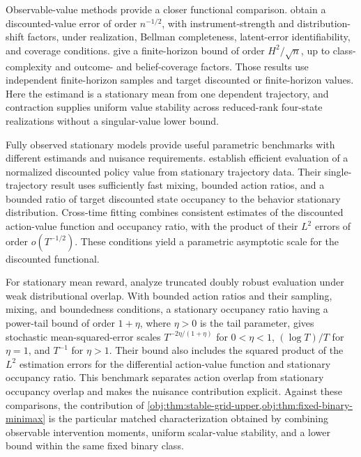 \documentclass[11pt]{article}
\begin{document}
Observable-value methods provide a closer functional comparison. \citet[Theorem 3]{Uehara2023} obtain a discounted-value error of order \(n^{-1/2}\), with instrument-strength and distribution-shift factors, under realization, Bellman completeness, latent-error identifiability, and coverage conditions. \citet[Theorem 7]{Zhang2024} give a finite-horizon bound of order \(H^2/\sqrt n\), up to class-complexity and outcome- and belief-coverage factors. Those results use independent finite-horizon samples and target discounted or finite-horizon values. Here the estimand is a stationary mean from one dependent trajectory, and contraction supplies uniform value stability across reduced-rank four-state realizations without a singular-value lower bound.

Fully observed stationary models provide useful parametric benchmarks with different estimands and nuisance requirements. \citet[Section 4 and Theorem 12]{KallusUehara2022} establish efficient evaluation of a normalized discounted policy value from stationary trajectory data. Their single-trajectory result uses sufficiently fast mixing, bounded action ratios, and a bounded ratio of target discounted state occupancy to the behavior stationary distribution. Cross-time fitting combines consistent estimates of the discounted action-value function and occupancy ratio, with the product of their \(L^2\) errors of order \(o(T^{-1/2})\). These conditions yield a parametric asymptotic scale for the discounted functional.

For stationary mean reward, \citet[Section 3.2, Assumptions 7--8, and Theorem 3.9]{Mehrabi2024} analyze truncated doubly robust evaluation under weak distributional overlap. With bounded action ratios and their sampling, mixing, and boundedness conditions, a stationary occupancy ratio having a power-tail bound of order \(1+\eta\), where \(\eta>0\) is the tail parameter, gives stochastic mean-squared-error scales \(T^{-2\eta/(1+\eta)}\) for \(0<\eta<1\), \((\log T)/T\) for \(\eta=1\), and \(T^{-1}\) for \(\eta>1\). Their bound also includes the squared product of the \(L^2\) estimation errors for the differential action-value function and stationary occupancy ratio. This benchmark separates action overlap from stationary occupancy overlap and makes the nuisance contribution explicit. Against these comparisons, the contribution of \cref{obj:thm:stable-grid-upper,obj:thm:fixed-binary-minimax} is the particular matched characterization obtained by combining observable intervention moments, uniform scalar-value stability, and a lower bound within the same fixed binary class.
\end{document}
